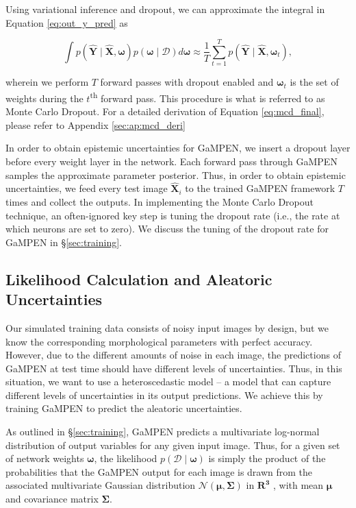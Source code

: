 \documentclass[twocolumn]{aastex63}
\newcommand\gampen{GaMPEN}
\begin{document}
\begin{CJK*}{UTF8}{gbsn}
Using variational inference and dropout, we can approximate the integral in Equation \ref{eq:out_y_pred} as 

\begin{equation}
\int p(\boldsymbol{\hat{Y}} \mid \boldsymbol{\hat{X}}, \boldsymbol{\omega}) p(\boldsymbol{\omega} \mid \mathcal{D}) d \boldsymbol{\omega} \approx \frac{1}{T} \sum_{t=1}^{T} p(\boldsymbol{\hat{Y}} \mid \boldsymbol{\hat{X}}, \boldsymbol{\omega}_t) ,
\label{eq:mcd_final}
\end{equation}

\noindent
wherein we perform $T$ forward passes with dropout enabled and $\boldsymbol{\omega}_t$ is the set of weights during the $t$\textsuperscript{th} forward pass. This procedure is what is referred to as Monte Carlo Dropout. For a detailed derivation of Equation \ref{eq:mcd_final}, please refer to Appendix \ref{sec:ap:mcd_deri}

In order to obtain epistemic uncertainties for \gampen{}, we insert a dropout layer before every weight layer in the network. Each forward pass through \gampen{} samples the approximate parameter posterior. Thus, in order to obtain epistemic uncertainties, we feed every test image $\boldsymbol{\hat{X}}_i$ to the trained \gampen{} framework $T$ times and collect the outputs. In implementing the Monte Carlo Dropout technique, an often-ignored key step is tuning the dropout rate (i.e., the rate at which neurons are set to zero). We discuss the tuning of the dropout rate for \gampen{} in \S \ref{sec:training}.

\vspace{0.8cm}


\subsection{Likelihood Calculation and Aleatoric Uncertainties}
\label{subsec:aleatoric}
Our simulated training data consists of noisy input images by design, but we know the corresponding morphological parameters with perfect accuracy. However, due to the different amounts of noise in each image, the predictions of \gampen{} at test time should have different levels of uncertainties. Thus, in this situation, we want to use a heteroscedastic model -- a model that can capture different levels of uncertainties in its output predictions. We achieve this by training \gampen{} to predict the aleatoric uncertainties. 

As outlined in \S \ref{sec:training}, \gampen{} predicts a multivariate log-normal distribution of output variables for any given input image. Thus, for a given set of network weights $\boldsymbol{\omega}$, the likelihood $p(\mathcal{D} \mid \boldsymbol{\omega})$ is simply the product of the probabilities that the \gampen{} output for each image is drawn from the associated multivariate Gaussian distribution $\mathcal{N}(\boldsymbol{\mu}, \boldsymbol{\Sigma})$ in $\mathbf{R^3}$ , with mean $\boldsymbol{\mu}$ and covariance matrix $\boldsymbol{\Sigma}$.


\end{CJK*}
\end{document}
